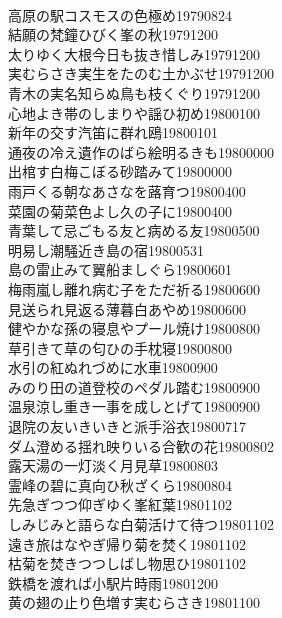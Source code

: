 \begin{multicols}{2}
\\高原の駅コスモスの色極め\hfill{19790824}
\\結願の梵鐘ひびく峯の秋\hfill{19791200}
\\太りゆく大根今日も抜き惜しみ\hfill{19791200}
\\実むらさき実生をたのむ土かぶせ\hfill{19791200}
\\青木の実名知らぬ鳥も枝くぐり\hfill{19791200}
\\心地よき帯のしまりや謡ひ初め\hfill{19800100}
\\新年の交す汽笛に群れ鴎\hfill{19800101}
\\通夜の冷え遺作のばら絵明るきも\hfill{19800000}
\\出棺す白梅こぼる砂踏みて\hfill{19800000}
\\雨戸くる朝なあさなを蕗育つ\hfill{19800400}
\\菜園の菊菜色よし久の子に\hfill{19800400}
\\青葉して忌ごもる友と病める友\hfill{19800500}
\\明易し潮騒近き島の宿\hfill{19800531}
\\島の雷止みて翼船ましぐら\hfill{19800601}
\\梅雨嵐し離れ病む子をただ祈る\hfill{19800600}
\\見送られ見返る薄暮白あやめ\hfill{19800600}
\\健やかな孫の寝息やプール焼け\hfill{19800800}
\\草引きて草の匂ひの手枕寝\hfill{19800800}
\\水引の紅ぬれづめに水車\hfill{19800900}
\\みのり田の道登校のペダル踏む\hfill{19800900}
\\温泉涼し重き一事を成しとげて\hfill{19800900}
\\退院の友いきいきと派手浴衣\hfill{19800717}
\\ダム澄める揺れ映りいる合歓の花\hfill{19800802}
\\露天湯の一灯淡く月見草\hfill{19800803}
\\霊峰の碧に真向ひ秋ざくら\hfill{19800804}
\\先急ぎつつ仰ぎゆく峯紅葉\hfill{19801102}
\\しみじみと語らな白菊活けて待つ\hfill{19801102}
\\遠き旅はなやぎ帰り菊を焚く\hfill{19801102}
\\枯菊を焚きつつしばし物思ひ\hfill{19801102}
\\鉄橋を渡れば小駅片時雨\hfill{19801200}
\\黄の翅の止り色増す実むらさき\hfill{19801100}

\end{multicols}
